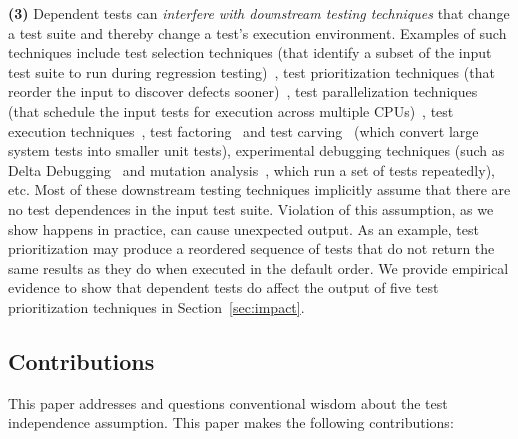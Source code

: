 \textbf{(3)}
Dependent tests can \textit{interfere with downstream testing
techniques} that change a test suite and thereby change a test's execution environment.
Examples of such techniques include
test selection techniques (that identify a subset of
the input test suite to run during
regression testing)~\cite{harroldetal:OOPSLA:2001, Orso:2004:SRT,
Briand:2009:ART, Zhang:2012:RMT},
test prioritization techniques (that reorder the
input to discover defects sooner)~\cite{Elbaum:2000:PTC:347324.348910, Kim:2002:HTP:581339.581357, Rummel:2005:TPR:1066677.1067016, Srivastava:2002:EPT:566172.566187, Jiang:2009:ART},
test parallelization techniques (that schedule the input tests for execution across multiple
CPUs)~\cite{Misailovic:2007}, test execution techniques~\cite{SPLAT},
test factoring~\cite{Saff:2005} and test carving~\cite{Elbaum:2006} (which
convert large system tests into smaller unit tests),
experimental debugging techniques (such as Delta
Debugging~\cite{Zeller:2002, Steimann:2013} and mutation analysis~\cite{Zhang:2012:RMT, Schuler:2009:EMT},
which run a set of tests repeatedly), etc. 
Most of these downstream testing techniques implicitly assume that
there are no test dependences in the input test suite. Violation of
this assumption, as we show happens in practice, can cause unexpected
output. %
As an example, test prioritization may produce a reordered sequence
of tests that do not
return the same results as they do when executed in
the default order. We provide empirical evidence to show that
dependent tests do affect the output of five test prioritization
techniques in Section~\ref{sec:impact}.


\subsection{Contributions}
\label{sec:contributions}

This paper addresses and questions
conventional wisdom about the test independence assumption. 
This paper makes the following contributions:

